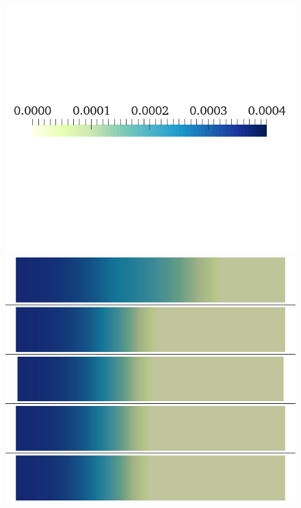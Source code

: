 \documentclass{article}
\begin{document}
%
\begin{figure}
\begin{minipage}{0.5\textwidth}
\includegraphics[trim=0cm 7cm 0cm 6cm, clip=true, width=1\linewidth]{legend_cai}
\includegraphics[trim=0cm 0cm 0cm 0cm, clip=true, width=1\linewidth]{cai_gk1}
    \end{minipage}
    \begin{minipage}{0.5\textwidth}

\end{minipage}
\end{figure}
\end{document}
